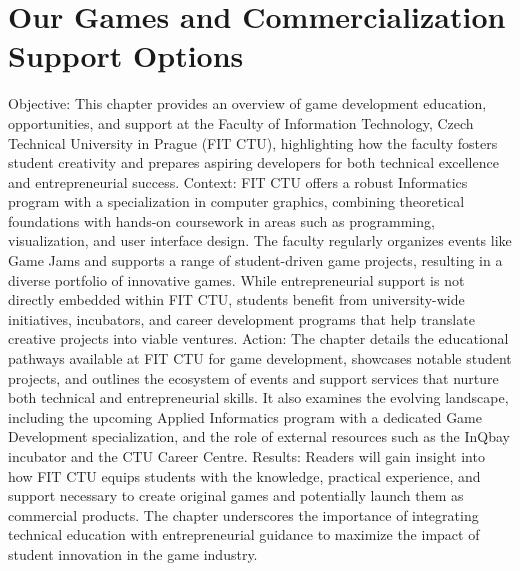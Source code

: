 \chapter{Our Games and Commercialization Support Options}

\begin{chapterabstract}	
    Objective:
    This chapter provides an overview of game development education, opportunities, and support at the Faculty of Information Technology, Czech Technical University in Prague (FIT CTU), highlighting how the faculty fosters student creativity and prepares aspiring developers for both technical excellence and entrepreneurial success.
    Context:
    FIT CTU offers a robust Informatics program with a specialization in computer graphics, combining theoretical foundations with hands-on coursework in areas such as programming, visualization, and user interface design. The faculty regularly organizes events like Game Jams and supports a range of student-driven game projects, resulting in a diverse portfolio of innovative games. While entrepreneurial support is not directly embedded within FIT CTU, students benefit from university-wide initiatives, incubators, and career development programs that help translate creative projects into viable ventures.
    Action:
    The chapter details the educational pathways available at FIT CTU for game development, showcases notable student projects, and outlines the ecosystem of events and support services that nurture both technical and entrepreneurial skills. It also examines the evolving landscape, including the upcoming Applied Informatics program with a dedicated Game Development specialization, and the role of external resources such as the InQbay incubator and the CTU Career Centre.
    Results:
    Readers will gain insight into how FIT CTU equips students with the knowledge, practical experience, and support necessary to create original games and potentially launch them as commercial products. The chapter underscores the importance of integrating technical education with entrepreneurial guidance to maximize the impact of student innovation in the game industry.
\end{chapterabstract}

